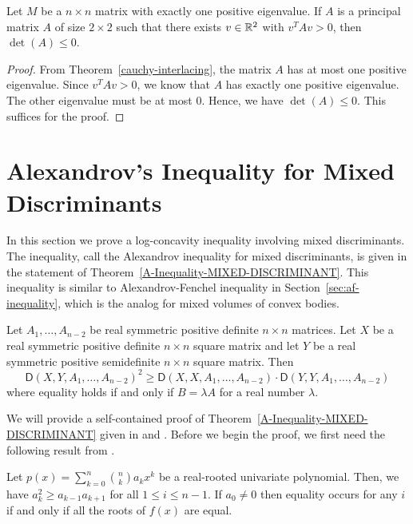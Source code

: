 \documentclass{puthesis-UG}
\begin{document}
\begin{cor}
	Let $M$ be a $n \times n$ matrix with exactly one positive eigenvalue. If $A$ is a principal matrix $A$ of size $2 \times 2$ such that there exists $v \in \mathbb{R}^2$ with $v^T A v > 0$, then $\det (A) \leq 0$. 
\end{cor}

\begin{proof}
	From Theorem~\ref{cauchy-interlacing}, the matrix $A$ has at most one positive eigenvalue. Since $v^T A v > 0$, we know that $A$ has exactly one positive eigenvalue. The other eigenvalue must be at most $0$. Hence, we have $\det (A) \leq 0$. This suffices for the proof. 
\end{proof}

\section{Alexandrov's Inequality for Mixed Discriminants} \label{sec:a-inequality}

In this section we prove a log-concavity inequality involving mixed discriminants. The inequality, call the Alexandrov inequality for mixed discriminants, is given in the statement of Theorem~\ref{A-Inequality-MIXED-DISCRIMINANT}. This inequality is similar to Alexandrov-Fenchel inequality in Section~\ref{sec:af-inequality}, which is the analog for mixed volumes of convex bodies. 

\begin{thm}  \label{A-Inequality-MIXED-DISCRIMINANT}
	Let $A_1, \ldots, A_{n-2}$ be real symmetric positive definite $n \times n$ matrices. Let $X$ be a real symmetric positive definite $n \times n$ square matrix and let $Y$ be a real symmetric positive semidefinite $n \times n$ square matrix. Then 
	\[
		\mathsf{D}(X, Y, A_1, \ldots, A_{n-2})^2 \geq \mathsf{D}(X, X, A_1, \ldots, A_{n-2}) \cdot \mathsf{D} (Y, Y, A_1, \ldots, A_{n-2})
	\]
	where equality holds if and only if $B = \lambda A$ for a real number $\lambda$. 
\end{thm}

We will provide a self-contained proof of Theorem~\ref{A-Inequality-MIXED-DISCRIMINANT} given in \cite{bapat_raghavan_1997} and \cite{schneider-mixed-discriminants}.  Before we begin the proof, we first need the following result from \cite{hardy1952inequalities}. 

\begin{lem}  \label{newton}
	Let $p(x) = \sum_{k = 0}^n \binom{n}{k} a_k x^k$ be a real-rooted univariate polynomial. Then, we have $a_k^2 \geq a_{k-1}a_{k+1}$ for all $1 \leq i \leq n-1$. If $a_0 \neq 0$ then equality occurs for any $i$ if and only if all the roots of $f(x)$ are equal. 
\end{lem}
\end{document}
